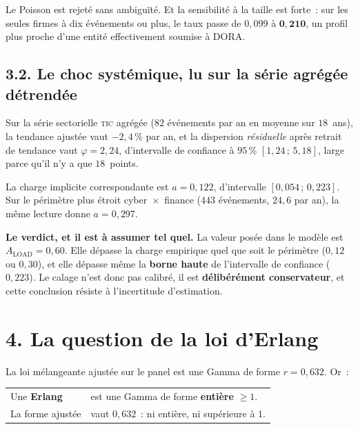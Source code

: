 \documentclass[11pt,a4paper]{article}
\begin{document}
\medskip
Le Poisson est rejeté sans ambiguïté. Et la sensibilité à la taille est forte~: sur les
seules firmes à dix événements ou plus, le taux passe de $0{,}099$ à $\mathbf{0{,}210}$, un
profil plus proche d'une entité effectivement soumise à DORA.

\subsection*{3.2. Le choc systémique, lu sur la série agrégée détrendée}

Sur la série sectorielle \textsc{tic} agrégée ($82$ événements par an en moyenne sur
$18$~ans), la tendance ajustée vaut $-2{,}4\,\%$ par an, et la dispersion \emph{résiduelle}
après retrait de tendance vaut $\varphi=2{,}24$, d'intervalle de confiance à $95\,\%$
$[1{,}24\,;\,5{,}18]$, large parce qu'il n'y a que $18$~points.

La charge implicite correspondante est $a=0{,}122$, d'intervalle $[0{,}054\,;\,0{,}223]$.
Sur le périmètre plus étroit cyber~$\times$~finance ($443$ événements, $24{,}6$ par an),
la même lecture donne $a=0{,}297$.

\begin{cle}
\textbf{Le verdict, et il est à assumer tel quel.} La valeur posée dans le modèle est
$A_{\text{LOAD}}=0{,}60$. Elle dépasse la charge empirique quel que soit le périmètre
($0{,}12$ ou $0{,}30$), et elle dépasse même la \textbf{borne haute} de l'intervalle de
confiance ($0{,}223$). Le calage n'est donc pas calibré, il est \textbf{délibérément
conservateur}, et cette conclusion résiste à l'incertitude d'estimation.
\end{cle}

\section*{4. La question de la loi d'Erlang}

La loi mélangeante ajustée sur le panel est une Gamma de forme $r=0{,}632$. Or~:

\begin{center}\small
\begin{tabular}{@{}l l@{}}
\toprule
Une \textbf{Erlang} & est une Gamma de forme \textbf{entière} $\ge 1$. \\
La forme ajustée & vaut $0{,}632$~: ni entière, ni supérieure à $1$. \\
\bottomrule
\end{tabular}
\end{center}
\end{document}
